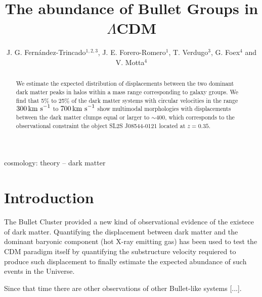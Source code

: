 \documentclass{emulateapj}
\newcommand{\hkpc}{{\ifmmode{h^{-1}{\rm kpc}}\else{$h^{-1}$kpc }\fi}}
\newcommand{\kms}{{\ifmmode{{\mathrm{\,km\ s}^{-1}}}\else{\,km~s$^{-1}$}\fi}}
\begin{document}
 

\title{The abundance of Bullet Groups in $\Lambda$CDM}
\author{J. G. Fern\'andez-Trincado$^{1,2,3}$, J. E. Forero-Romero$^1$,
  T. Verdugo$^3$, G. Foex$^4$ and V. Motta$^4$} 

\begin{abstract}

We estimate the expected distribution of displacements between the two
dominant dark matter peaks in halos within a mass range corresponding
to galaxy groups. We find that 5\% to 25\% of the dark matter systems
with circular velocities in the range $300\kms$ to $700\kms$ show
multimodal morphologies with displacements between the dark matter
clumps equal or larger to $\sim 400$\hkpc, which corresponds to the
observational constraint the object SL2S J08544-0121 located at
$z=0.35$. 
\end{abstract}

\begin{keywords}
{cosmology: theory -- dark matter} 
\end{keywords}

\section{Introduction}


The Bullet Cluster provided a new kind of observational evidence of
the existece of dark matter. Quantifying the displacement between dark
matter and the dominant baryonic component (hot X-ray emitting gas)
\citep{ForeroRomero2010} has been used to test the CDM paradigm itself
by quantifying the substructure velocity requiered to produce such
displacement \citep{Hayashi2006} to finally estimate the expected
abundance of such events in the Universe. 


Since that time there are other observations of other Bullet-like
systems [...].
\end{document}
